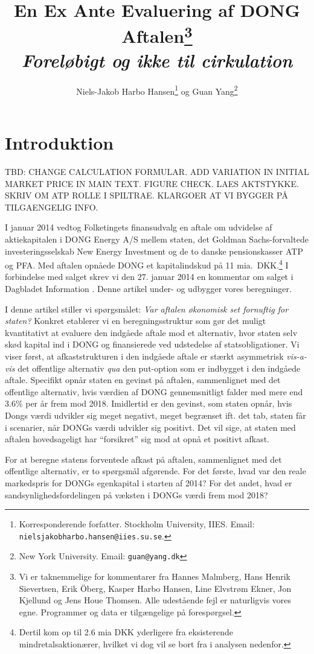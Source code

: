 \documentclass{article}
\title{En Ex Ante Evaluering af DONG Aftalen\thanks{Vi er taknemmelige for kommentarer fra Hannes Malmberg, Hans Henrik Sievertsen, Erik {\"O}berg, Kasper Harbo Hansen, Line Elvstrøm Ekner, Jon Kjellund og Jens Houe Thomsen. Alle udestående fejl er naturligvis vores egne.  Programmer og data er tilgængelige på forespørgsel.} \\ \emph{Foreløbigt og ikke til cirkulation}}
\author{Niels-Jakob Harbo Hansen\thanks{Korresponderende forfatter. Stockholm University, IIES.  Email: \texttt{nielsjakobharbo.hansen@iies.su.se}. } \hspace{0.1 mm} og Guan Yang\thanks{New York University.  Email: \texttt{guan@yang.dk}}}
\begin{document}
\maketitle

\newpage

\section{Introduktion}

TBD: CHANGE CALCULATION FORMULAR. ADD VARIATION IN INITIAL MARKET PRICE IN MAIN TEXT. FIGURE CHECK. LAES AKTSTYKKE. SKRIV OM ATP ROLLE I SPILTRAE. KLARGOER AT VI BYGGER PÅ TILGAENGELIG INFO.

I januar 2014 vedtog Folketingets finansudvalg en aftale om udvidelse af aktiekapitalen i DONG Energy A/S mellem staten, det Goldman Sachs-forvaltede investeringsselskab New Energy Investment og de to danske pensionskasser ATP og PFA\@. Med aftalen opnåede DONG et kapitalindskud på 11 mia.\ DKK.\footnote{Dertil kom op til 2.6 mia DKK yderligere fra eksisterende mindretalsaktionærer, hvilket vi dog vil se bort fra i analysen nedenfor.} I forbindelse med salget skrev vi den 27. januar 2014 en kommentar om salget i Dagbladet Information \citep{Hansen2014}. Denne artikel under- og udbygger vores beregninger.

I denne artikel stiller vi spørgsmålet: \emph{Var aftalen økonomisk set fornuftig for staten?} Konkret etablerer vi en beregningsstruktur som gør det muligt kvantitativt at evaluere den indgåede aftale mod et alternativ, hvor staten selv skød kapital ind i DONG og finansierede ved udstedelse af statsobligationer. Vi viser først, at afkaststrukturen i den indgåede aftale er stærkt asymmetrisk \emph{vis-a-vis} det offentlige alternativ \emph{qua} den put-option som er indbygget i den indgåede aftale. Specifikt opnår staten en gevinst på aftalen, sammenlignet med det offentlige alternativ, hvis værdien af DONG gennemsnitligt falder med mere end 3.6\% per år frem mod 2018. Imidlertid er den gevinst, som staten opnår, hvis Dongs værdi udvikler sig meget negativt, meget begrænset ift. det tab, staten får i scenarier, når DONGs værdi udvikler sig positivt. Det vil sige, at staten med aftalen hovedsageligt har \enquote{forsikret} sig mod at opnå et positivt afkast. 

For at beregne statens forventede afkast på aftalen, sammenlignet med det offentlige alternativ, er to spørgsmål afgørende. For det første, hvad var den reale markedspris for DONGs egenkapital i starten af 2014? For det andet, hvad er sandsynlighedsfordelingen på væksten i DONGs værdi frem mod 2018? 
\end{document}
